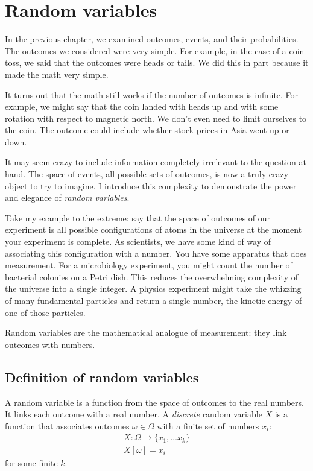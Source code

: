 
\chapter{Random variables}

In the previous chapter, we examined outcomes, events, and their
probabilities. The outcomes we considered were very simple. For example, in
the case of a coin toss, we said that the outcomes were heads or tails. We did
this in part because it made the math very simple.

It turns out that the math still works if the number of outcomes is infinite.
For example, we might say that the coin landed with heads up and with some
rotation with respect to magnetic north. We don't even need to limit ourselves
to the coin. The outcome could include whether stock prices in Asia went up or
down.

It may seem crazy to include information completely irrelevant to the question
at hand. The space of events, all possible sets of outcomes, is now a truly
crazy object to try to imagine. I introduce this complexity to demonstrate the
power and elegance of \emph{random variables}.

Take my example to the extreme: say that the space of outcomes of our
experiment is all possible configurations of atoms in the universe at the
moment your experiment is complete. As scientists, we have some kind of way of
associating this configuration with a number. You have some apparatus that
does measurement. For a microbiology experiment, you might count the number of
bacterial colonies on a Petri dish. This reduces the overwhelming complexity
of the universe into a single integer. A physics experiment might take the
whizzing of many fundamental particles and return a single number, the kinetic
energy of one of those particles.

Random variables are the mathematical analogue of measurement: they
link outcomes with numbers.

\section{Definition of random variables}

A random variable is a function from the space of outcomes to the real
numbers. It links each outcome with a real number. A \emph{discrete} random
variable $X$ is a function that associates outcomes $\omega \in \Omega$ with a
finite set of numbers $x_i$:
\begin{gather*}
X : \Omega \to \{x_1, \ldots x_k\} \\
X[\omega] = x_i
\end{gather*}
for some finite $k$.

